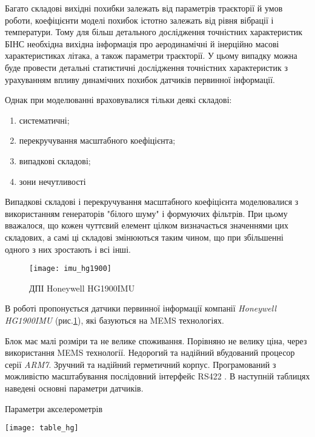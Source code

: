 Багато складові вихідні похибки залежать від параметрів траєкторії й умов роботи, коефіцієнти моделі 
похибок істотно залежать від рівня вібрації і температури. Тому для більш детального дослідження 
точністних характеристик  БІНС необхідна вихідна інформація про аеродинамічні й інерційно масові 
характеристиках літака, а також параметри траєкторії. У цьому випадку можна буде провести детальні 
статистичні дослідження точністних характеристик з урахуванням впливу динамічних похибок датчиків первинної інформації.

Однак при моделюванні враховувалися тільки деякі складові:
\begin{enumerate}
  \item систематичні;
  \item перекручування масштабного коефіцієнта;
  \item випадкові складові;
  \item зони нечутливості
\end{enumerate}

Випадкові складові і перекручування масштабного коефіцієнта моделювалися 
з використанням генераторів "білого шуму" і формуючих фільтрів. При цьому 
вважалося, що кожен чуттєвий елемент цілком визначається значеннями цих 
складових, а самі ці складові змінюються таким чином, що при збільшенні 
одного з них зростають і всі інші. 
\begin{figure}[here]
\centering
\texttt{[image: imu\_hg1900]}
\caption{ДПІ Honeywell HG1900IMU}
\label{fig:imu_hg1900}
\end{figure} 
В роботі пропонується датчики первинної інформації компанії \textit{Honeywell HG1900IMU} (рис.\ref{fig:imu_hg1900}),
які базуються на MEMS технологіях. 

Блок має малі розміри та не велике споживання. Порівняно не велику ціна, через
використання MEMS технології. Недорогий та надійний вбудований процесор серії
\textit{ARM7}. Зручний та надійний герметичний корпус. Програмований з можливістю
масштабування послідовний інтерфейс RS422 .
В наступній таблицях наведені основні параметри датчиків.
\begin{table}[here]
\centering
\caption{Параметри акселерометрів}
\texttt{[image: table\_hg]}

\label{tab:table_hg}
\end{table}










